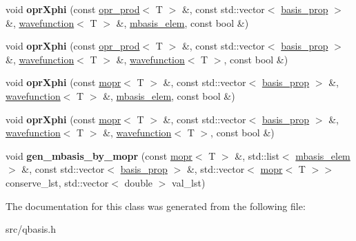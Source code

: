 \begin{DoxyCompactItemize}
\item 
\mbox{\label{classqbasis_1_1wavefunction_a358a9009899e330604ef5cef110115f2}} 
void {\bfseries opr\+Xphi} (const \hyperlink{classqbasis_1_1opr__prod}{opr\+\_\+prod}$<$ T $>$ \&, const std\+::vector$<$ \hyperlink{classqbasis_1_1basis__prop}{basis\+\_\+prop} $>$ \&, \hyperlink{classqbasis_1_1wavefunction}{wavefunction}$<$ T $>$ \&, \hyperlink{classqbasis_1_1mbasis__elem}{mbasis\+\_\+elem}, const bool \&)
\item 
\mbox{\label{classqbasis_1_1wavefunction_aaec0b4b8d0787d76e9e56aac52e4f346}} 
void {\bfseries opr\+Xphi} (const \hyperlink{classqbasis_1_1opr__prod}{opr\+\_\+prod}$<$ T $>$ \&, const std\+::vector$<$ \hyperlink{classqbasis_1_1basis__prop}{basis\+\_\+prop} $>$ \&, \hyperlink{classqbasis_1_1wavefunction}{wavefunction}$<$ T $>$ \&, \hyperlink{classqbasis_1_1wavefunction}{wavefunction}$<$ T $>$, const bool \&)
\item 
\mbox{\label{classqbasis_1_1wavefunction_a3fec6e182555899e170646f231d6d759}} 
void {\bfseries opr\+Xphi} (const \hyperlink{classqbasis_1_1mopr}{mopr}$<$ T $>$ \&, const std\+::vector$<$ \hyperlink{classqbasis_1_1basis__prop}{basis\+\_\+prop} $>$ \&, \hyperlink{classqbasis_1_1wavefunction}{wavefunction}$<$ T $>$ \&, \hyperlink{classqbasis_1_1mbasis__elem}{mbasis\+\_\+elem}, const bool \&)
\item 
\mbox{\label{classqbasis_1_1wavefunction_a2579cd6e4389cbf1e32d3addc3733f85}} 
void {\bfseries opr\+Xphi} (const \hyperlink{classqbasis_1_1mopr}{mopr}$<$ T $>$ \&, const std\+::vector$<$ \hyperlink{classqbasis_1_1basis__prop}{basis\+\_\+prop} $>$ \&, \hyperlink{classqbasis_1_1wavefunction}{wavefunction}$<$ T $>$ \&, \hyperlink{classqbasis_1_1wavefunction}{wavefunction}$<$ T $>$, const bool \&)
\item 
\mbox{\label{classqbasis_1_1wavefunction_a4eb4692297545b8baf275681ed69f625}} 
void {\bfseries gen\+\_\+mbasis\+\_\+by\+\_\+mopr} (const \hyperlink{classqbasis_1_1mopr}{mopr}$<$ T $>$ \&, std\+::list$<$ \hyperlink{classqbasis_1_1mbasis__elem}{mbasis\+\_\+elem} $>$ \&, const std\+::vector$<$ \hyperlink{classqbasis_1_1basis__prop}{basis\+\_\+prop} $>$ \&, std\+::vector$<$ \hyperlink{classqbasis_1_1mopr}{mopr}$<$ T $>$$>$ conserve\+\_\+lst, std\+::vector$<$ double $>$ val\+\_\+lst)
\end{DoxyCompactItemize}


The documentation for this class was generated from the following file\+:\begin{DoxyCompactItemize}
\item 
src/qbasis.\+h\end{DoxyCompactItemize}
